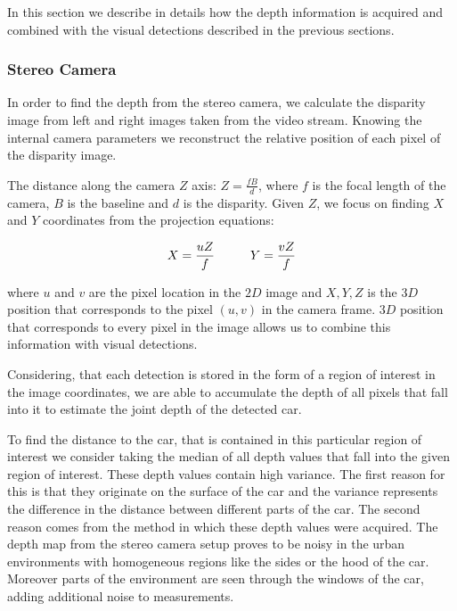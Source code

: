 In this section we describe in details how the depth information is acquired
and combined with the visual detections described in the previous sections.

\subsubsection{Stereo Camera}\label{ssub:stereo_camera}

In order to find the depth from the stereo camera, we calculate the disparity
image from left and right images taken from the video stream. Knowing the
internal camera parameters we reconstruct the relative position of each pixel
of the disparity image.

The distance along the camera $Z$ axis: $Z = \frac{fB}{d}$, where $f$ is the
focal length of the camera, $B$ is the baseline and $d$ is the disparity.
Given $Z$, we focus on finding $X$ and $Y$ coordinates from the projection
equations:

\begin{equation}
X = \frac{uZ}{f}
\hspace{10 mm}
Y = \frac{vZ}{f}
\end{equation}

where $u$ and $v$ are the pixel location in the $2D$ image and $X, Y, Z$ is
the $3D$ position that corresponds to the pixel $(u,v)$ in the camera frame.
$3D$ position that corresponds to every pixel in the image allows us to
combine this information with visual detections.

Considering, that each detection is stored in the form of a region of interest
in the image coordinates, we are able to accumulate the depth of all pixels
that fall into it to estimate the joint depth of the detected car.

To find the distance to the car, that is contained in this particular region
of interest we consider taking the median of all depth values that fall into
the given region of interest. These depth values contain high variance. The
first reason for this is that they originate on the surface of the car and the
variance represents the difference in the distance between different parts of
the car. The second reason comes from the method in which these depth values
were acquired. The depth map from the stereo camera setup proves to be noisy
in the urban environments with homogeneous regions like the sides or the hood
of the car. Moreover parts of the environment are seen through the windows of
the car, adding additional noise to measurements.

